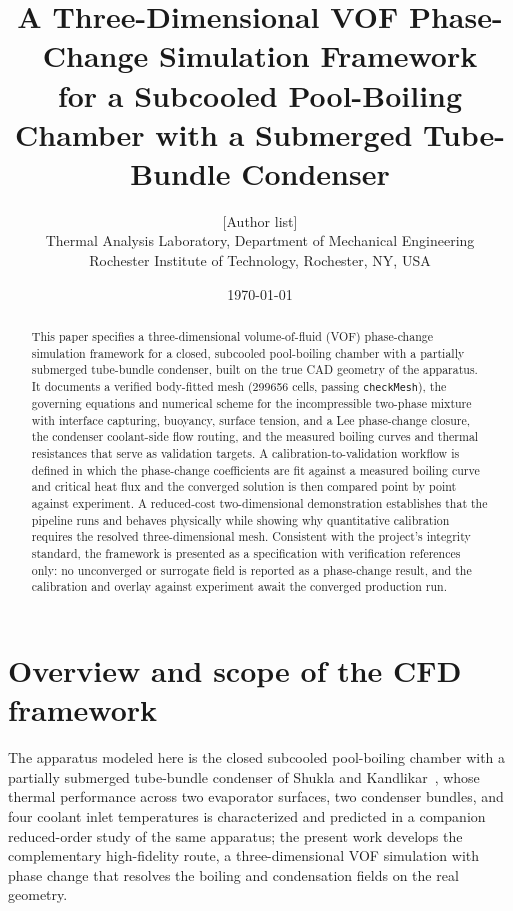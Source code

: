 \documentclass[11pt]{article}
\title{\textbf{A Three-Dimensional VOF Phase-Change Simulation Framework\\
for a Subcooled Pool-Boiling Chamber with a Submerged Tube-Bundle Condenser}}
\author{[Author list]\\
\small Thermal Analysis Laboratory, Department of Mechanical Engineering\\
\small Rochester Institute of Technology, Rochester, NY, USA}
\date{\today}
\begin{document}
\maketitle

\begin{abstract}
\noindent
This paper specifies a three-dimensional volume-of-fluid (VOF) phase-change simulation framework
for a closed, subcooled pool-boiling chamber with a partially submerged tube-bundle condenser,
built on the true CAD geometry of the apparatus. It documents a verified body-fitted mesh
(\num{299656} cells, passing \texttt{checkMesh}), the governing equations and numerical scheme
for the incompressible two-phase mixture with interface capturing, buoyancy, surface tension, and
a Lee phase-change closure, the condenser coolant-side flow routing, and the measured boiling
curves and thermal resistances that serve as validation targets. A calibration-to-validation
workflow is defined in which the phase-change coefficients are fit against a measured boiling
curve and critical heat flux and the converged solution is then compared point by point against
experiment. A reduced-cost two-dimensional demonstration establishes that the pipeline runs and
behaves physically while showing why quantitative calibration requires the resolved
three-dimensional mesh. Consistent with the project's integrity standard, the framework is
presented as a specification with verification references only: no unconverged or surrogate field
is reported as a phase-change result, and the calibration and overlay against experiment await the
converged production run.
\end{abstract}

\tableofcontents
\clearpage

\section{Overview and scope of the CFD framework}
The apparatus modeled here is the closed subcooled pool-boiling chamber with a partially
submerged tube-bundle condenser of Shukla and Kandlikar~\cite{shukla2024}, whose thermal
performance across two evaporator surfaces, two condenser bundles, and four coolant inlet
temperatures is characterized and predicted in a companion reduced-order study of the same
apparatus; the present work develops the complementary high-fidelity route, a three-dimensional
VOF simulation with phase change that resolves the boiling and condensation fields on the real
geometry.
\end{document}
